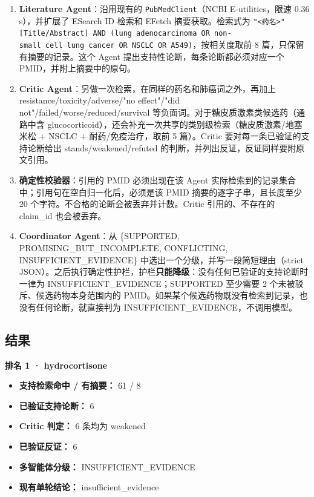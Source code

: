 \documentclass[
  10pt,
]{ctexart}
\providecommand{\tightlist}{%
  \setlength{\itemsep}{0pt}\setlength{\parskip}{0pt}}
\begin{document}
\begin{enumerate}
\def\labelenumi{\arabic{enumi}.}
\tightlist
\item
  \textbf{Literature Agent}：沿用现有的 \texttt{PubMedClient}（NCBI
  E-utilities，限速 0.36 s），并扩展了 ESearch ID 检索和 EFetch
  摘要获取。检索式为
  \texttt{"\textless{}药名\textgreater{}"{[}Title/\allowbreak{}Abstract{]}\ AND\ (lung\ adenocarcinoma\ OR\ non-small\ cell\ lung\ cancer\ OR\ NSCLC\ OR\ A549)}，按相关度取前
  8 篇，只保留有摘要的记录。这个 Agent
  提出支持性论断，每条论断都必须对应一个 PMID，并附上摘要中的原句。
\item
  \textbf{Critic Agent}：另做一次检索，在同样的药名和肺癌词之外，再加上
  resistance/toxicity/adverse/"no effect"/"did
  not"/failed/worse/reduced/survival
  等负面词。对于糖皮质激素类候选药（通路中含
  glucocorticoid），还会补充一次共享的类别级检索（糖皮质激素/地塞米松 +
  NSCLC + 耐药/免疫治疗，取前 5 篇）。Critic
  要对每一条已验证的支持论断给出 stands/weakened/refuted
  的判断，并列出反证，反证同样要附原文引用。
\item
  \textbf{确定性校验器}：引用的 PMID 必须出现在该 Agent
  实际检索到的记录集合中；引用句在空白归一化后，必须是该 PMID
  摘要的逐字子串，且长度至少 20
  个字符。不合格的论断会被丢弃并计数。Critic 引用的、不存在的 claim\_id
  也会被丢弃。
\item
  \textbf{Coordinator Agent}：从 \{SUPPORTED,
  PROMISING\_BUT\_INCOMPLETE, CONFLICTING, INSUFFICIENT\_EVIDENCE\}
  中选出一个分级，并写一段简短理由（strict
  JSON）。之后执行确定性护栏，护栏\textbf{只能降级}：没有任何已验证的支持论断时一律为
  INSUFFICIENT\_EVIDENCE；SUPPORTED 至少需要 2
  个未被驳斥、候选药物本身范围内的
  PMID。如果某个候选药物既没有检索到记录，也没有任何论断，就直接判为
  INSUFFICIENT\_EVIDENCE，不调用模型。
\end{enumerate}

\subsection{结果}\label{ux7ed3ux679c}

\textbf{排名 1 · hydrocortisone}

\begin{itemize}
\tightlist
\item
  \textbf{支持检索命中 / 有摘要：} 61 / 8
\item
  \textbf{已验证支持论断：} 6
\item
  \textbf{Critic 判定：} 6 条均为 weakened
\item
  \textbf{已验证反证：} 6
\item
  \textbf{多智能体分级：} INSUFFICIENT\_EVIDENCE
\item
  \textbf{现有单轮结论：} insufficient\_evidence
\end{itemize}
\end{document}
